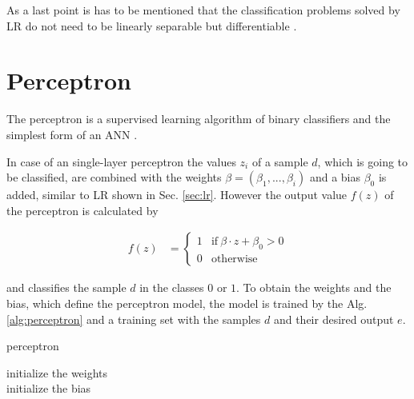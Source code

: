 As a last point is has to be mentioned that the classification problems solved by \ac{LR} do not need to be linearly separable but differentiable \cite{Ruhrmair2010ModelingFunctions}.


\section{Perceptron}
\label{sec:perceptron}

The perceptron is a supervised learning algorithm of binary classifiers and the simplest form of an \ac{ANN} \cite{Rosenblatt1957TheAutomaton}. 

In case of an single-layer perceptron the values $z_i$ of a sample $d$, which is going to be classified, are combined with the weights $\beta =(\beta_1, ..., \beta_i)$ and a bias $\beta_0$ is added, similar to \ac{LR} shown in Sec. \ref{sec:lr}.
However the output value $f(z)$ of the perceptron is calculated by

\begin{align*}
f(z) &= \begin{cases}
1 & \text{if}\ \beta \cdot z + \beta_0 > 0\\
0 & \text{otherwise}
\end{cases}
\end{align*}

and classifies the sample $d$ in the classes $0$ or $1$.
To obtain the weights and the bias, which define the perceptron model, the model is trained by the Alg. \ref{alg:perceptron} and a training set with the samples $d$ and their desired output $e$.

\SetAlCapHSkip{0.2em}
\begin{algorithm}[H]
\Indm
\SetAlgoLined
\caption{perceptron}
\label{alg:perceptron}
\Indp

initialize the weights\\ %
initialize the bias\\ %

\end{algorithm}

